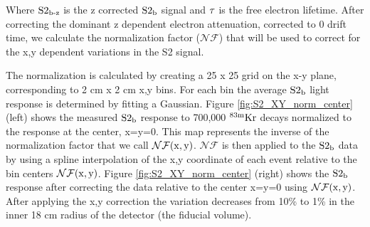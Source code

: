 \noindent Where $\rm S2_{\operatorname{b-z}}$ is the z corrected $\rm S2_b$ signal and $\rm \tau$ is the free electron lifetime. After correcting the dominant z dependent electron attenuation, corrected to 0 drift time, we calculate the normalization factor ($\mathcal{NF}$) that will be used to correct for the x,y dependent variations in the S2 signal.

The normalization is calculated by creating a 25 x 25 grid on the x-y plane, corresponding to 2 cm x 2 cm x,y bins. For each bin the average $\rm S2_b$ light response is determined by fitting a Gaussian. Figure \ref{fig:S2_XY_norm_center} (left) shows the measured $\rm S2_b$ response to 700,000 $\rm^{83m}Kr$ decays normalized to the response at the center, x=y=0. This map represents the inverse of the normalization factor that we call $\rm\mathcal{NF}(x,y)$. $\mathcal{NF}$ is then applied to the $\rm S2_b$ data by using a spline interpolation of the x,y coordinate of each event relative to the bin centers $\rm\mathcal{NF}(x,y)$. Figure \ref{fig:S2_XY_norm_center} (right) shows the $\rm S2_b$ response after correcting the data relative to the center x=y=0 using $\rm\mathcal{NF}(x,y)$. After applying the x,y correction the variation decreases from 10\% to 1\% in the inner 18 cm radius of the detector (the fiducial volume).


